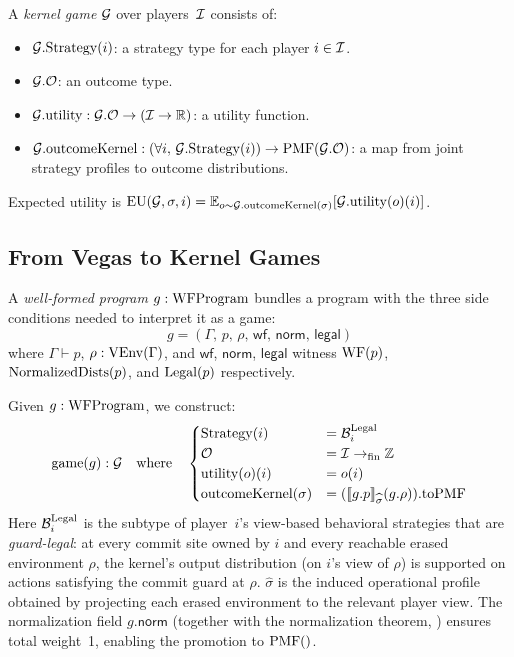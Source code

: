 \documentclass[11pt]{article}
\begin{document}
\begin{definition}
A \emph{kernel game} $\mathcal{G}$ over players~$\mathcal{I}$ consists of:
\begin{itemize}[nosep]
\item $\mathcal{G}.\mathrm{Strategy}(i)$: a strategy type for each player $i \in \mathcal{I}$.
\item $\mathcal{G}.\mathcal{O}$: an outcome type.
\item $\mathcal{G}.\mathrm{utility} : \mathcal{G}.\mathcal{O} \to (\mathcal{I} \to \mathbb{R})$:
      a utility function.
\item $\mathcal{G}.\mathrm{outcomeKernel} :
      (\forall i,\, \mathcal{G}.\mathrm{Strategy}(i)) \to \mathrm{PMF}(\mathcal{G}.\mathcal{O})$:
      a map from joint strategy profiles to outcome distributions.
\end{itemize}
Expected utility is
$\mathrm{EU}(\mathcal{G}, \sigma, i) = \mathbb{E}_{o \sim \mathcal{G}.\mathrm{outcomeKernel}(\sigma)}
  [\mathcal{G}.\mathrm{utility}(o)(i)]$.
\end{definition}

\subsection{From Vegas to Kernel Games}\label{sec:tokernelgame}

\begin{definition}\label{def:wfprog}
A \emph{well-formed program} $g : \mathrm{WFProgram}$ bundles a program with the three
side conditions needed to interpret it as a game:
\[
  g = (\Gamma,\, p,\, \rho,\, \mathsf{wf},\, \mathsf{norm},\, \mathsf{legal})
\]
where $\Gamma \vdash p$, $\rho : \mathrm{VEnv}(\Gamma)$, and $\mathsf{wf}$,
$\mathsf{norm}$, $\mathsf{legal}$ witness $\mathrm{WF}(p)$, $\mathrm{NormalizedDists}(p)$, and
$\mathrm{Legal}(p)$ respectively. 
\end{definition}

\noindent
Given $g : \mathrm{WFProgram}$, we construct:
\[
  \mathrm{game}(g) : \mathcal{G} \quad\text{where}\quad
  \begin{cases}
    \mathrm{Strategy}(i) &= \mathcal{B}^{\mathrm{Legal}}_i \\
    \mathcal{O} &= \mathcal{I} \to_{\mathrm{fin}} \mathbb{Z} \\
    \mathrm{utility}(o)(i) &= o(i) \\
    \mathrm{outcomeKernel}(\sigma) &=
      (\llbracket g.p \rrbracket_{\widehat{\sigma}}(g.\rho)).\mathrm{toPMF}
  \end{cases}
\]
Here $\mathcal{B}^{\mathrm{Legal}}_i$ is the subtype of player~$i$'s view-based
behavioral strategies that are \emph{guard-legal}: at every commit site
owned by $i$ and every reachable erased environment $\rho$, the kernel's
output distribution (on $i$'s view of $\rho$) is supported on actions
satisfying the commit guard at $\rho$.
$\widehat{\sigma}$ is the induced operational profile obtained by
projecting each erased environment to the relevant player view.
The normalization field $g.\mathsf{norm}$ (together with the normalization
theorem, ) ensures total weight~1, enabling the promotion to
$\mathrm{PMF}()$.
\end{document}
